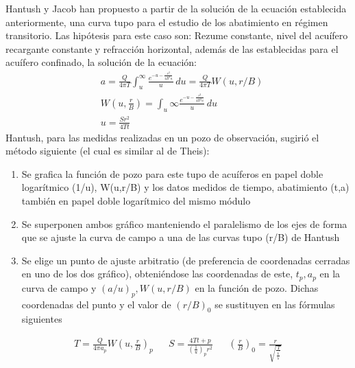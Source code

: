 Hantush y Jacob han propuesto a partir de la solución de la ecuación establecida anteriormente, una curva tupo para el estudio de los abatimiento en régimen transitorio. Las hipótesis para este caso son: Rezume constante, nivel del acuífero recargante constante y refracción horizontal, además de las establecidas para el acuífero confinado, la solución de la ecuación:
\begin{align}
    &a= \frac{Q}{4\pi T} \int_{u}^{\infty} \frac{e^{ - u -\frac{r^2}{4B^2 u}}}{u}\, du = \frac{Q}{4\pi T} W(u,r/B)\\
    &W\left(u,\frac{r}{B}\right) = \int_{u}{\infty} \frac{e^{ - u -\frac{r^2}{4B^2 u}}}{u}\, du\\
    &u = \frac{Sr^2}{4Tt}
\end{align}
Hantush, para las medidas realizadas en un pozo de observación, sugirió el método siguiente (el cual es similar al de Theis):
\begin{enumerate}
    \item Se grafica la función de pozo para este tupo de acuíferos en papel doble logarítmico (1/u), W(u,r/B) y los datos medidos de tiempo, abatimiento (t,a) también en papel doble logarítmico del mismo módulo
    \item Se superponen ambos gráfico manteniendo el paralelismo de los ejes de forma que se ajuste la curva de campo a una de las curvas tupo (r/B) de Hantush
    \item Se elige un punto de ajuste arbitratio (de preferencia de coordenadas cerradas en uno de los dos gráfico), obteniéndose las coordenadas de este, $t_p, a_p$ en la curva de campo y $(a/u)_p, W(u, r/B)$ en la función de pozo. Dichas coordenadas del punto y el valor de $(r/B)_0$ se sustituyen en las fórmulas siguientes
\end{enumerate}
\begin{align}
    T= \frac{Q}{4\pi a_p} W\left(u, \frac{r}{B}\right)_p&& S = \frac{4Tt +p}{\left(\frac{1}{u}\right)_p r^2} && \left(\frac{r}{B}\right)_0 = \frac{r}{\sqrt{\frac{T}{\frac{k^{\prime}}{b^{\prime}}}}}
\end{align}

